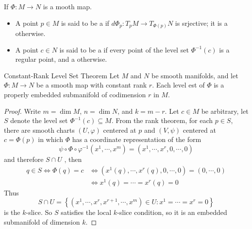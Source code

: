 \documentclass[../main.tex]{subfiles}
\begin{document}
\begin{definition}{}{}
    If \(  \Phi :M\to N  \) is a mooth map.
    \begin{itemize}
        \item A point \(  p \in M  \) is said to be a  if \(  d\Phi _{p}:T_{p}M\to T_{\Phi \left( p \right) }N  \) is srjective; it is a  otherwise.
        \item A point \(  c \in N  \) is said to be a  if every point of the level set \(  \Phi ^{-1} \left( c \right)   \) is a regular point, and a  otherwise.    
    \end{itemize}
     
\end{definition}

\begin{theorem}{Constant-Rank Level Set Theorem}{}
    Let \(  M  \) and \(  N  \) be smooth manifolds, and let \(  \Phi :M\to N  \) be a smooth map with constant rank \(  r  \). Each level est of \(  \Phi   \) is a properly embedded submanifold of codimension \(  r  \) in \(  M  \).        
\end{theorem}
\begin{proof}
    Write \(  m= \operatorname{dim}M  \), \(  n =  \operatorname{dim}N  \), and \(  k= m-r  \). Let \(  c \in M  \) be arbitrary, let \(  S  \) denote the level set \(  \Phi ^{-1} \left( c \right)\subseteq M   \). From the rank theorem, for each \(  p \in S  \), there are smooth charts \(  \left( U, \varphi  \right)   \) centered at \(  p  \) and \(  \left( V,\psi  \right)   \) centered at \(  c= \Phi \left( p \right)   \) in which \(  \Phi   \) has a coordinate representation of the form \[
    \psi \circ \Phi \circ  \varphi ^{-1} \left( x^{1},\cdots ,x^{m} \right)= \left( x^{1},\cdots ,x^{r},0,\cdots ,0 \right)  
    \] and therefore \(  S\cap U  \) , then \[
  \begin{aligned}
    q\in S\iff \Phi \left( q \right)= c&\iff \left( x^{1}\left( q \right),\cdots ,x^{r}\left( q \right),0,\cdots ,0   \right)=  \left( 0,\cdots ,0 \right)  
     \\&\iff x^{1}\left( q \right)= \cdots = x^{r}\left( q \right)= 0  
  \end{aligned}   
    \] Thus \[
    S\cap U= \left\{ \left( x^{1},\cdots ,x^{r},x^{r+ 1},\cdots ,x^{m} \right)\in U: x^{1}= \cdots = x^{r}= 0  \right\}
    \] is the \(  k  \)-slice. So \(  S  \) satisfies the local \(  k  \)-slice condition, so it is an embedded submanifold of dimension \(  k  \).    
\end{proof}
\end{document}
